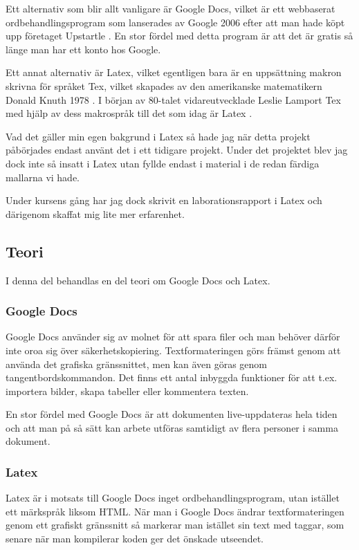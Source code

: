 Ett alternativ som blir allt vanligare är Google Docs, vilket är ett webbaserat ordbehandlingsprogram som lanserades av Google 2006 \cite{docs_launch} efter att man hade köpt upp företaget Upstartle \cite{upstartle}. En stor fördel med detta program är att det är gratis så länge man har ett konto hos Google.

Ett annat alternativ är Latex, vilket egentligen bara är en uppsättning makron skrivna för språket Tex, vilket skapades av den amerikanske matematikern Donald Knuth 1978 \cite{donald_knuth}. I början av 80-talet vidareutvecklade Leslie Lamport Tex med hjälp av dess makrospråk till det som 
idag är Latex \cite{leslie_lamport}.

Vad det gäller min egen bakgrund i Latex så hade jag när detta projekt påbörjades endast använt det i ett tidigare projekt. Under det projektet blev jag dock inte så insatt i Latex utan fyllde endast i material i de redan färdiga mallarna vi hade.

Under kursens gång har jag dock skrivit en laborationsrapport i Latex och därigenom skaffat mig lite mer erfarenhet.


\subsection{Teori}
I denna del behandlas en del teori om Google Docs och Latex.
\subsubsection{Google Docs}
Google Docs använder sig av molnet för att spara filer och man behöver därför inte oroa sig över säkerhetskopiering. Textformateringen görs främst genom att använda det grafiska gränssnittet, men kan även göras genom tangentbordskommandon. Det finns ett antal inbyggda funktioner för att t.ex. importera bilder, skapa tabeller eller kommentera texten.

En stor fördel med Google Docs är att dokumenten live-uppdateras hela tiden och att man på så sätt kan arbete utföras samtidigt av flera personer i samma dokument.

\subsubsection{Latex}
Latex är i motsats till Google Docs inget ordbehandlingsprogram, utan istället ett märkspråk liksom HTML. När man i Google Docs ändrar textformateringen genom ett grafiskt gränssnitt så markerar man istället sin text med taggar, som senare när man kompilerar koden ger det önskade utseendet. 

